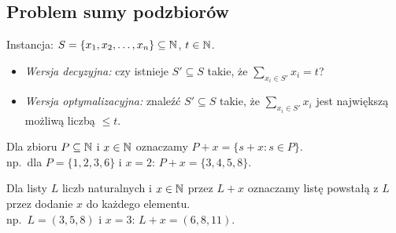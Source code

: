 \subsection{Problem sumy podzbiorów}

\begin{problem} \label{problem:subsetsum}
	Instancja: $S = \{x_1, x_2, \ldots, x_n\} \subseteq \mathbb{N}$, $t \in \mathbb{N}$.
	\begin{itemize}[nosep]
		\item \emph{Wersja decyzyjna:} czy istnieje $S' \subseteq S$ takie, że $\sum_{x_i \in S'} x_i = t$?
		\item \emph{Wersja optymalizacyjna:} znaleźć $S' \subseteq S$ takie, że $\sum_{x_i \in S'} x_i$ jest największą możliwą liczbą $\leq t$.
	\end{itemize}
\end{problem}

Dla zbioru $P \subseteq \mathbb{N}$ i $x \in \mathbb{N}$ oznaczamy $P + x = \{s + x : s \in P\}$.\\
np.\ dla $P = \{1, 2, 3, 6\}$ i $x = 2$: \quad $P + x = \{3, 4, 5, 8\}$.

Dla listy $L$ liczb naturalnych i $x \in \mathbb{N}$ przez $L + x$ oznaczamy listę powstałą z $L$ przez dodanie $x$ do każdego elementu.\\
np.\ $L = (3, 5, 8)$ i $x = 3$: \quad $L + x = (6, 8, 11)$.

